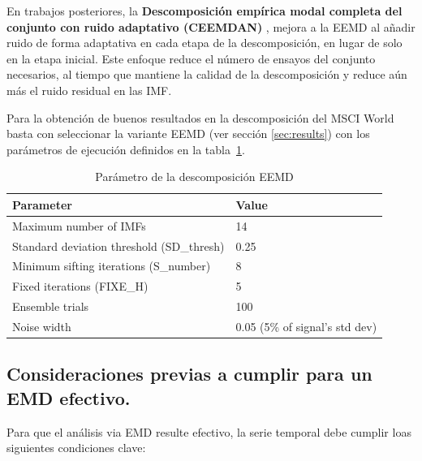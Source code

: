 \documentclass[11pt,a4paper]{article}
\begin{document}
En trabajos posteriores, la \textbf{Descomposición empírica modal completa del conjunto con ruido adaptativo (CEEMDAN)} \citep{torres2011complete}, mejora a la EEMD al añadir ruido de forma adaptativa en cada etapa de la descomposición, en lugar de solo en la etapa inicial. Este enfoque reduce el número de ensayos del conjunto necesarios, al tiempo que mantiene la calidad de la descomposición y reduce aún más el ruido residual en las IMF.

Para la obtención de buenos resultados en la descomposición del MSCI World basta con seleccionar la variante EEMD (ver sección \ref{sec:results}) con los parámetros de ejecución definidos en la tabla~\ref{tab:eemd_params}.

\begin{table}[h]
\centering
\caption{Parámetro de la descomposición EEMD}
\label{tab:eemd_params}
\begin{tabular}{ll}
\toprule
\textbf{Parameter} & \textbf{Value} \\
\midrule
Maximum number of IMFs & 14 \\
Standard deviation threshold (SD\_thresh) & 0.25 \\
Minimum sifting iterations (S\_number) & 8 \\
Fixed iterations (FIXE\_H) & 5 \\
Ensemble trials & 100 \\
Noise width & 0.05 (5\% of signal's std dev) \\
\bottomrule
\end{tabular}
\end{table}

\subsection{Consideraciones previas a cumplir para un EMD efectivo.}

Para que el análisis via EMD resulte efectivo, la serie temporal debe cumplir loas siguientes condiciones clave:
\end{document}
